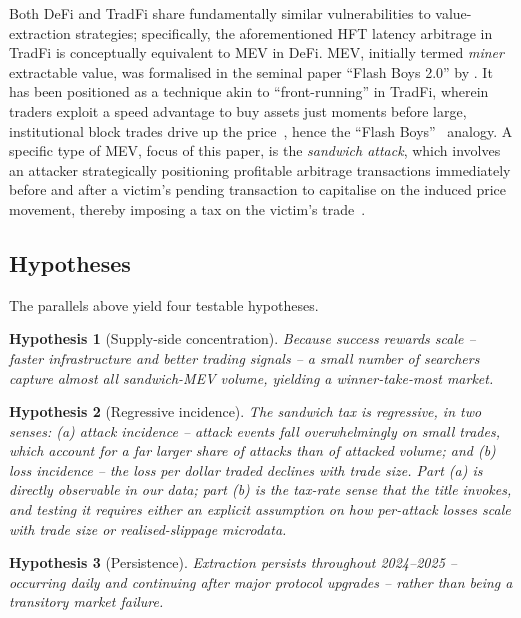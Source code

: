 \documentclass[pdflatex, sn-basic]{sn-jnl}
\theoremstyle{thmstylethree}%
\newtheorem{hypothesis}{Hypothesis}
\begin{document}
	Both \ac{DeFi} and \ac{TradFi} share fundamentally similar vulnerabilities to value-extraction strategies; specifically, the aforementioned \ac{HFT} latency arbitrage in \ac{TradFi} is conceptually equivalent to \ac{MEV} in \ac{DeFi}.
	\ac{MEV}, initially termed \textit{miner} extractable value, was formalised in the seminal paper \enquote{Flash Boys 2.0} by \citet{Daian2020}.
	It has been positioned as a technique akin to \enquote{front-running} in \ac{TradFi}, wherein traders exploit a speed advantage to buy assets just moments before large, institutional block trades drive up the price~\citep{Protter2015}, hence the \enquote{Flash Boys}~\citep{Lewis2014} analogy.
	A specific type of \ac{MEV}, focus of this paper, is the \emph{sandwich attack}, which involves an attacker strategically positioning profitable arbitrage transactions immediately before and after a victim's pending transaction to capitalise on the induced price movement, thereby imposing a tax on the victim’s trade~\citep{Heimbach2022}.

	\subsection{Hypotheses}
	\label{subsec:hypotheses}

	The parallels above yield four testable hypotheses.

	\begin{hypothesis}[Supply-side concentration]
	\label{hyp:concentration}
	Because success rewards scale -- faster infrastructure and better trading signals -- a small number of searchers capture almost all sandwich-\ac{MEV} volume, yielding a winner-take-most market.
	\end{hypothesis}

	\begin{hypothesis}[Regressive incidence]
	\label{hyp:regressive}
	The sandwich tax is regressive, in two senses: (a) \emph{attack incidence} -- attack events fall overwhelmingly on small trades, which account for a far larger share of attacks than of attacked volume; and (b) \emph{loss incidence} -- the loss per dollar traded declines with trade size.
	Part (a) is directly observable in our data; part (b) is the tax-rate sense that the title invokes, and testing it requires either an explicit assumption on how per-attack losses scale with trade size or realised-slippage microdata.
	\end{hypothesis}

	\begin{hypothesis}[Persistence]
	\label{hyp:persistence}
	Extraction persists throughout 2024--2025 -- occurring daily and continuing after major protocol upgrades -- rather than being a transitory market failure.
	\end{hypothesis}
\end{document}
